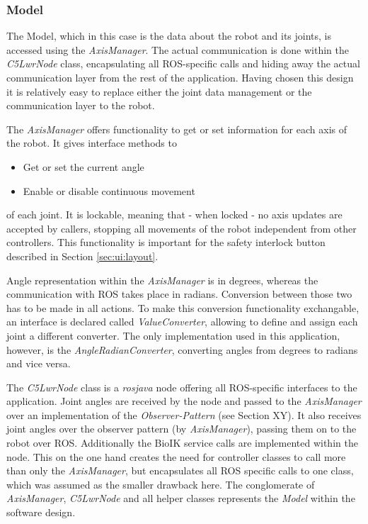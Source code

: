 \subsubsection{Model}

The Model, which in this case is the data about the robot and its joints, is accessed using the \textit{AxisManager}. The actual communication is done within the \textit{C5LwrNode} class, encapsulating all ROS-specific calls and hiding away the actual communication layer from the rest of the application. Having chosen this design it is relatively easy to replace either the joint data management or the communication layer to the robot.

The \textit{AxisManager} offers functionality to get or set information for each axis of the robot. It gives interface methods to
\begin{itemize}
	\item Get or set the current angle
	\item Enable or disable continuous movement
\end{itemize}
of each joint. It is lockable, meaning that - when locked - no axis updates are accepted by callers, stopping all movements of the robot independent from other controllers. This functionality is important for the safety interlock button described in Section \ref{sec:ui:layout}.

Angle representation within the \textit{AxisManager} is in degrees, whereas the communication with ROS takes place in radians. Conversion between those two has to be made in all actions. To make this conversion functionality exchangable, an interface is declared called \textit{ValueConverter}, allowing to define and assign each joint a different converter. The only implementation used in this application, however, is the \textit{AngleRadianConverter}, converting angles from degrees to radians and vice versa.

The \textit{C5LwrNode} class is a \textit{rosjava} node offering all ROS-specific interfaces to the application. Joint angles are received by the node and passed to the \textit{AxisManager} over an implementation of the \textit{Observer-Pattern} (see Section XY). It also receives joint angles over the observer pattern (by \textit{AxisManager}), passing them on to the robot over ROS. Additionally the BioIK service calls are implemented within the node. This on the one hand creates the need for controller classes to call more than only the \textit{AxisManager}, but encapsulates all ROS specific calls to one class, which was assumed as the smaller drawback here. The conglomerate of \textit{AxisManager}, \textit{C5LwrNode} and all helper classes represents the \textit{Model} within the software design.

